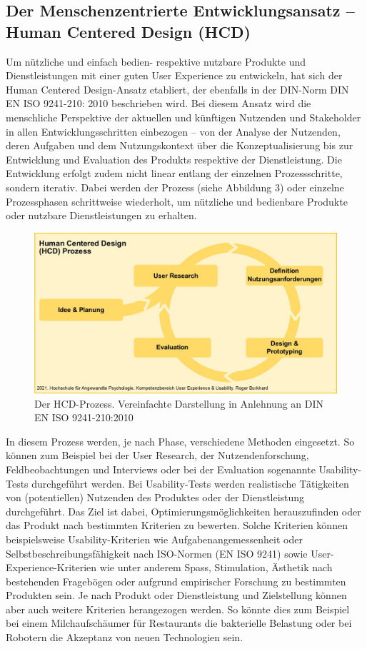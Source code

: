 \documentclass[a4paper,
fontsize=11pt,
oneside,
numbers=noperiodatend,
parskip=half-,
bibliography=totoc,
final
]{scrartcl}
\begin{document}
\hypertarget{der-menschenzentrierte-entwicklungsansatz-human-centered-design-hcd}{%
\subsection{Der Menschenzentrierte Entwicklungsansatz -- Human Centered Design (HCD)}\label{der-menschenzentrierte-entwicklungsansatz-human-centered-design-hcd}}

Um nützliche und einfach bedien- respektive nutzbare Produkte und
Dienstleistungen mit einer guten User Experience zu entwickeln, hat sich
der Human Centered Design-Ansatz etabliert, der ebenfalls in der
DIN-Norm DIN EN ISO 9241-210: 2010 beschrieben wird. Bei diesem Ansatz
wird die menschliche Perspektive der aktuellen und künftigen Nutzenden
und Stakeholder in allen Entwicklungsschritten einbezogen -- von der
Analyse der Nutzenden, deren Aufgaben und dem Nutzungskontext über die
Konzeptualisierung bis zur Entwicklung und Evaluation des Produkts
respektive der Dienstleistung. Die Entwicklung erfolgt zudem nicht
linear entlang der einzelnen Prozessschritte, sondern iterativ. Dabei
werden der Prozess (siehe Abbildung 3) oder einzelne Prozessphasen
schrittweise wiederholt, um nützliche und bedienbare Produkte oder
nutzbare Dienstleistungen zu erhalten.

\begin{figure}
\centering
\includegraphics[width=.8\textwidth]{img/HCD-Prozess.jpg}
\caption{Der HCD-Prozess. Vereinfachte Darstellung in
Anlehnung an DIN EN ISO 9241-210:2010}
\end{figure}

In diesem Prozess werden, je nach Phase, verschiedene Methoden
eingesetzt. So können zum Beispiel bei der User Research, der
Nutzendenforschung, Feldbeobachtungen und Interviews oder bei der
Evaluation sogenannte Usability-Tests durchgeführt werden. Bei
Usability-Tests werden realistische Tätigkeiten von (potentiellen)
Nutzenden des Produktes oder der Dienstleistung durchgeführt. Das Ziel
ist dabei, Optimierungsmöglichkeiten herauszufinden oder das Produkt
nach bestimmten Kriterien zu bewerten. Solche Kriterien können
beispielsweise Usability-Kriterien wie Aufgabenangemessenheit oder
Selbstbeschreibungsfähigkeit nach ISO-Normen (EN ISO 9241) sowie
User-Experience-Kriterien wie unter anderem Spass, Stimulation, Ästhetik
nach bestehenden Fragebögen oder aufgrund empirischer Forschung zu
bestimmten Produkten sein. Je nach Produkt oder Dienstleistung und
Zielstellung können aber auch weitere Kriterien herangezogen werden. So
könnte dies zum Beispiel bei einem Milchaufschäumer für Restaurants die
bakterielle Belastung oder bei Robotern die Akzeptanz von neuen
Technologien sein.
\end{document}
